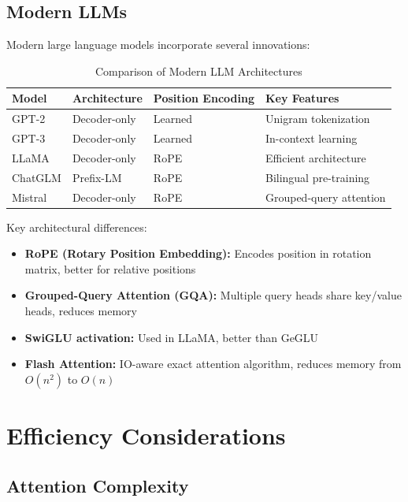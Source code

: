 \subsection{Modern LLMs}

Modern large language models incorporate several innovations:

\begin{table}[ht]
    \centering
    \caption{Comparison of Modern LLM Architectures}
    \begin{tabular}{L{2.5cm} L{3cm} L{3cm} L{3cm}}
        \toprule
        \textbf{Model} & \textbf{Architecture} & \textbf{Position Encoding} & \textbf{Key Features} \\
        \midrule
        GPT-2 & Decoder-only & Learned & Unigram tokenization \\
        GPT-3 & Decoder-only & Learned & In-context learning \\
        LLaMA & Decoder-only & RoPE & Efficient architecture \\
        ChatGLM & Prefix-LM & RoPE & Bilingual pre-training \\
        Mistral & Decoder-only & RoPE & Grouped-query attention \\
        \bottomrule
    \end{tabular}
\end{table}

Key architectural differences:
\begin{itemize}
    \item \textbf{RoPE (Rotary Position Embedding):} Encodes position in rotation matrix, better for relative positions
    \item \textbf{Grouped-Query Attention (GQA):} Multiple query heads share key/value heads, reduces memory
    \item \textbf{SwiGLU activation:} Used in LLaMA, better than GeGLU
    \item \textbf{Flash Attention:} IO-aware exact attention algorithm, reduces memory from $O(n^2)$ to $O(n)$
\end{itemize}

\section{Efficiency Considerations}

\subsection{Attention Complexity}

